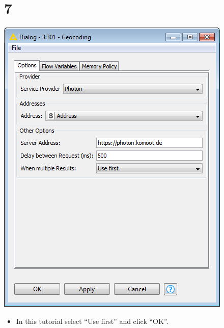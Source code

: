 \documentclass[10pt]{beamer}
\begin{document}
\section{7}
\begin{frame}
	\begin{center}
  		\includegraphics[height=0.5\textheight]{7.png}
	\end{center}
	\begin{itemize}
    \item In this tutorial select ``Use first'' and click ``OK''.
	\end{itemize}
\end{frame}
\end{document}
